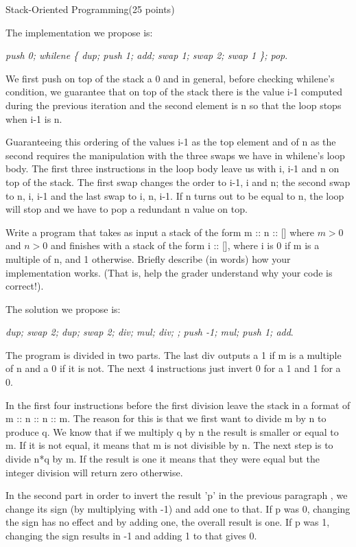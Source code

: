 \documentclass{article}
\begin{document}
\begin{question}{Stack-Oriented Programming}{(25 points)}
\begin{subquestion}
   The implementation we propose is:
   
   \emph{push 0; whilene \{ dup; push 1; add; swap 1; swap 2; swap 1 \}; pop}.
   
   We first push on top of the stack a 0 and in general, before checking whilene's condition, we guarantee that on top of the stack there is the value i-1 computed during the previous iteration and the second element is n so that the loop stops when i-1 is n.
   
   Guaranteeing this ordering of the values i-1 as the top element and of n as the second requires the manipulation with the three swaps we have in whilene's loop body. The first three instructions in the loop body leave us with i, i-1 and n on top of the stack. The first swap changes the order to i-1, i and n; the second swap to n, i, i-1 and the last swap to i, n, i-1. If n turns out to be equal to n, the loop will stop and we have to pop a redundant n value on top.
    
  \end{subquestion}
  
  
  
  \begin{subquestion}
     Write a program that takes as input a stack of the form m :: n :: [] where $m \gt 0$ and $n \gt 0$ and finishes
    with a stack of the form i :: [], where i is 0 if m is a multiple of n, and 1 otherwise. Briefly describe
    (in words) how your implementation works. (That is, help the grader understand why your code is
    correct!).
    
    The solution we propose is:
    
    \emph{dup; swap 2; dup; swap 2; div; mul; div; ; push -1; mul; push 1; add}.
    
    The program is divided in two parts. The last div outputs a 1 if m is a multiple of n and a 0 if it is not. The next 4 instructions just invert 0 for a 1 and 1 for a 0.
    
    In the first four instructions before the first division leave the stack in a format of m :: n :: n :: m. The reason for this is that we first want to divide m by n to produce q. We know that if we multiply q by n the result is smaller or equal to m. If it is not equal, it means that m is not divisible by n. The next step is to divide n*q by m. If the result is one it means that they were equal but the integer division will return zero otherwise.
    
    In the second part in order to invert the result 'p' in the previous paragraph , we change its sign (by multiplying with -1) and add one to that. If p was 0, changing the sign has no effect and by adding one, the overall result is one. If p was 1, changing the sign results in -1 and adding 1 to that gives 0.
    
    
  \end{subquestion}
  
    
\end{question}
\end{document}

